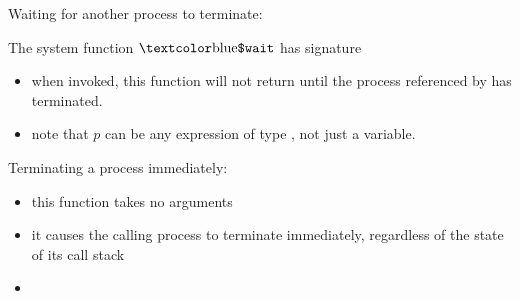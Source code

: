 \documentclass[t]{beamer}
\begin{document}
\begin{frame}{Waiting for another process to terminate: \cwait}

  The system function $\cwait$ has signature

  \begin{center}
  \end{center}

  \begin{itemize}
  \item when invoked, this function will not return until the process
    referenced by  has terminated.
  \item note that $p$ can be any
    expression of type \cproc{}, not just a variable.
  \end{itemize}
\end{frame}

\begin{frame}{Terminating a process immediately: \cexit}
  \begin{itemize}
  \item this function takes no arguments
  \item it causes the calling process to terminate immediately,
    regardless of the state of its call stack
  \item {}
  \end{itemize}
\end{frame}
\end{document}
